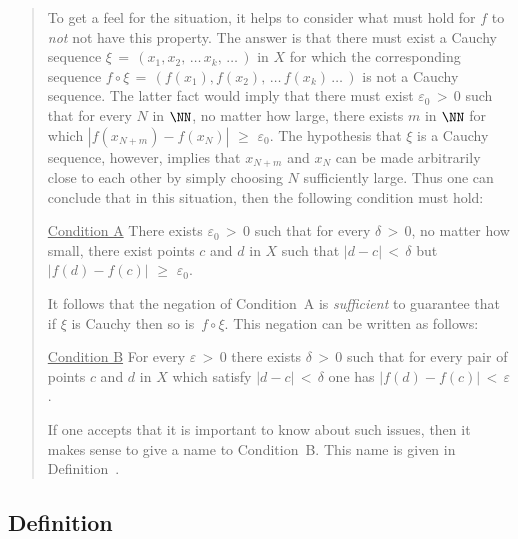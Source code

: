 \begin{quotation}
{\V

        To get a feel for the situation, it helps to consider what must hold for $f$ to {\em not} not have this property.
    The answer is that there must exist a Cauchy sequence ${\xi} \,=\, (x_{1}, x_{2},\,{\ldots}\,x_{k},\,{\ldots}\,)$ in $X$
    for which the corresponding sequence $f{\circ}{\xi}\,=\, (f(x_{1}),f(x_{2}),\,{\ldots}\,f(x_{k})\,{\ldots}\,)$ is not a Cauchy sequence.
    The latter fact would imply that there must exist ${\varepsilon}_{0}\,>\,0$ such that for every $N$ in ${\NN}$, no matter how large,
    there exists $m$ in ${\NN}$ for which $|f(x_{N+m})-f(x_{N})|\,\,{\geq}\,\,{\varepsilon}_{0}$.
    The hypothesis that ${\xi}$ is a Cauchy sequence, however, implies that $x_{N+m}$ and $x_{N}$
    can be made arbitrarily close to each other by simply choosing $N$ sufficiently large. Thus one can conclude that
    in this situation, then the following condition must hold:

\VA

    \underline{Condition A} There exists ${\varepsilon}_{0}\,>\,0$ such that for every ${\delta}\,>\,0$, no matter how small,
    there exist points $c$ and $d$ in $X$ such that $|d-c|\,<\,{\delta}$ but $|f(d)-f(c)|\,\,{\geq}\,\,{\varepsilon}_{0}$.

\VA

\hspace*{\parindent}It follows that the negation of Condition~A is {\em sufficient} to guarantee that if ${\xi}$ is Cauchy then so is~$f{\circ}{\xi}$.
    This negation can be written as follows:

\VA

        \underline{Condition B} For every ${\varepsilon}\,>\,0$ there exists ${\delta}\,>\,0$
    such that for every pair of points $c$ and $d$ in $X$ which satisfy $|d-c|\,<\,{\delta}$ one has $|f(d)-f(c)|\,<\,{\varepsilon}$.

\VA

        If one accepts that it is important to know about such issues, then it makes sense to give a name to Condition~B.
    This name is given in Definition~.


}%
\end{quotation}

\VV


            \subsection{\small{\bf Definition}}
            \label{DefD25.65}

